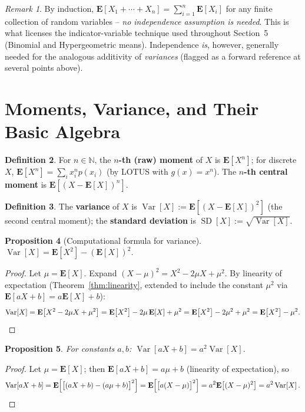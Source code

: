 \documentclass[11pt]{article}
\theoremstyle{definition}
\newtheorem{definition}{Definition}[section]
\theoremstyle{plain}
\newtheorem{proposition}[definition]{Proposition}
\theoremstyle{remark}
\newtheorem{remark}[definition]{Remark}
\newcommand{\E}[1]{\mathbf{E}\!\left[#1\right]}
\newcommand{\Var}[1]{\operatorname{Var}\!\left[#1\right]}
\newcommand{\SD}[1]{\operatorname{SD}\!\left[#1\right]}
\newcommand{\N}{\mathbb{N}}
\begin{document}
\begin{remark}
By induction, $\E{X_1+\cdots+X_n} = \sum_{i=1}^n \E{X_i}$ for any finite collection of random
variables -- \emph{no independence assumption is needed}. This is what licenses the
indicator-variable technique used throughout Section~5 (Binomial and Hypergeometric means).
Independence \emph{is}, however, generally needed for the analogous additivity of
\emph{variances} (flagged as a forward reference at several points above).
\end{remark}

\newpage
\section{Moments, Variance, and Their Basic Algebra}

\begin{definition}
For $n\in\N$, the \textbf{$n$-th (raw) moment} of $X$ is $\E{X^n}$; for discrete $X$,
$\E{X^n}=\sum_i x_i^n p(x_i)$ (by LOTUS with $g(x)=x^n$). The \textbf{$n$-th central moment} is
$\E{(X-\E{X})^n}$.
\end{definition}

\begin{definition}
The \textbf{variance} of $X$ is $\Var{X} := \E{(X-\E{X})^2}$ (the second central moment); the
\textbf{standard deviation} is $\SD{X}:=\sqrt{\Var{X}}$.
\end{definition}

\begin{proposition}[Computational formula for variance]
\label{prop:var-comp}
$\Var{X} = \E{X^2} - (\E{X})^2$.
\end{proposition}
\begin{proof}
Let $\mu = \E{X}$. Expand $(X-\mu)^2 = X^2 - 2\mu X + \mu^2$. By linearity of expectation
(Theorem~\ref{thm:linearity}, extended to include the constant $\mu^2$ via
$\E{aX+b}=a\E{X}+b$):
\[
\Var{X} = \E{X^2-2\mu X+\mu^2} = \E{X^2} - 2\mu\,\E{X} + \mu^2 = \E{X^2}-2\mu^2+\mu^2
= \E{X^2}-\mu^2. \qedhere
\]
\end{proof}

\begin{proposition}
For constants $a,b$: $\Var{aX+b} = a^2\Var{X}$.
\end{proposition}
\begin{proof}
Let $\mu=\E{X}$; then $\E{aX+b} = a\mu+b$ (linearity of expectation), so
\[
\Var{aX+b} = \E{\big[(aX+b) - (a\mu+b)\big]^2} = \E{\big[a(X-\mu)\big]^2}
= a^2\E{(X-\mu)^2} = a^2\Var{X}. \qedhere
\]
\end{proof}
\end{document}
